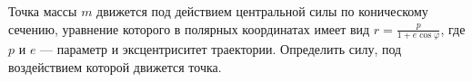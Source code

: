 Точка массы $m$ движется под действием центральной силы по коническому сечению,
уравнение которого в полярных координатах имеет вид $r = \frac{p}{1 + e\cos{\varphi}}$,
где $p$ и $e$ --- параметр и эксцентриситет траектории.
Определить силу, под воздействием которой движется точка.
